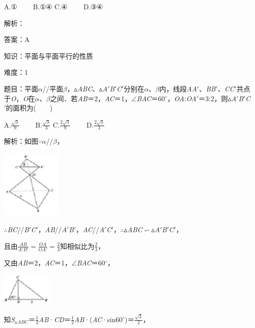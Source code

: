 \documentclass{article} %
\begin{document}
A.①　　 B.①④ C.④　　 D.③④

解析：

答案：A

知识：平面与平面平行的性质

难度：1

题目：平面\textit{$\alpha$}//平面\textit{$\beta$}，$\mathrm{\vartriangle}$\textit{ABC}、$\mathrm{\vartriangle}$\textit{A}$'$\textit{B}$'$\textit{C}$'$分别在\textit{$\alpha$}、\textit{$\beta$}内，线段\textit{AA}$'$、\textit{BB}$'$、\textit{CC}$'$共点于\textit{O}，\textit{O}在\textit{$\alpha$}、\textit{$\beta$}之间．若\textit{AB}＝2，\textit{AC}＝1，$\mathrm{\angle}$\textit{BAC}＝60$\mathrm{{}^\circ}$，\textit{OA}:\textit{OA}$'$＝3:2，则$\mathrm{\vartriangle}$\textit{A}$'$\textit{B}$'$\textit{C}$'$的面积为(　　)

A.$\frac{\sqrt3}{9}$　　 B.$\frac{\sqrt3}{3}$ C.$\frac{2\sqrt3}{9}$　　 D.$\frac{2\sqrt3}{3}$

解析：如图$\mathrm{\because}$\textit{$\alpha$}//\textit{$\beta$}，

\includegraphics*[width=1.16in, height=1.34in, keepaspectratio=false]{image176}

$\mathrm{\therefore}$\textit{BC}//\textit{B}$'$\textit{C}$'$，\textit{AB}//\textit{A}$'$\textit{B}$'$，\textit{AC}//\textit{A}$'$\textit{C}$'$，$\mathrm{\therefore}$$\mathrm{\vartriangle}$\textit{ABC}$\mathrm{\backsim}$$\mathrm{\vartriangle}$\textit{A}$'$\textit{B}$'$\textit{C}$'$，

且由$\frac{AB}{A\prime B\prime}=\frac{OA}{OA\prime}=\frac{2}{3}$知相似比为$\frac{2}{3}$，

又由\textit{AB}＝2，\textit{AC}＝1，$\mathrm{\angle}$\textit{BAC}＝60$\mathrm{{}^\circ}$，

\includegraphics*[width=0.97in, height=0.65in, keepaspectratio=false]{image177}

知\textit{S}${}_{\vartriangle }$\textit{${}_{ABC}$}＝$\frac{1}{2}$\textit{AB}·\textit{CD}＝$\frac{1}{2}$\textit{AB}·(\textit{AC}·sin60$\mathrm{{}^\circ}$)＝$\frac{\sqrt3}{2}$，
\end{document}
